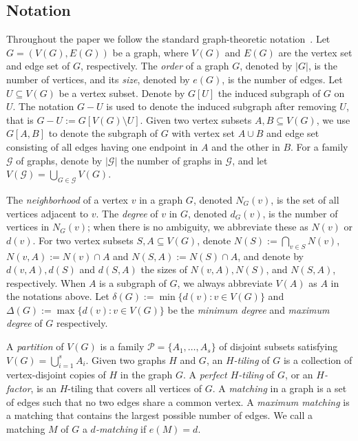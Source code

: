 \documentclass[11pt, a4paper]{article}
\theoremstyle{definition}
\newcommand{\<}{\subseteq}
\begin{document}
\subsection{Notation}
Throughout the paper we follow the standard graph-theoretic notation~\cite{diestel2017graph}. Let $G=(V(G),E(G))$ be a  graph, where $V(G)$ and $E(G)$ are the vertex set and edge set of $G$, respectively.
The \textit{order} of a graph $G$, denoted by $|G|$, is the  number of vertices, and its \textit{size}, denoted by $e(G)$, is the  number of edges.   %
Let $U\subseteq V(G)$ be a vertex subset. Denote by $G[U]$ the induced 
subgraph of $G$ on $U$. The notation $G-U$ is used to denote the induced subgraph after removing $U$,
that is $G-U:=G[V(G)\setminus U]$. Given two vertex subsets $A,B\subseteq V(G)$, we use $G[A,B]$ to denote the subgraph of $G$ with vertex set $A\cup B$ and edge set consisting of all edges having one endpoint in $A$ and the other in $B$. For a family $\mathcal{G}$ of graphs, denote by $|\mathcal{G}|$ the number of graphs in $\mathcal{G}$, and let $V(\mathcal{G}) = \bigcup_{G \in \mathcal{G}} V(G)$.

The \textit{neighborhood} of a vertex $v$ in a graph $G$, denoted $N_G(v)$, is the set of all vertices adjacent to $v$. The \textit{degree} of $v$ in $G$, denoted $d_G(v)$, is the number of vertices in $N_G(v)$; when there is no ambiguity, we abbreviate these as $N(v)$ or $d(v)$.  For two vertex subsets $S, A \subseteq V(G)$, denote  $N(S):=\bigcap_{v\in S}N(v)$, $N(v, A):=N(v)\cap A$ and $N(S, A):=N(S)\cap A$, %
 and denote by $d(v,A), d(S)$ and $d(S,A)$ the sizes of $N(v,A),N(S)$, and $N(S,A)$, respectively. When $A$ is a subgraph of $G$, we always abbreviate $V(A)$ as $A$ in the notations above.  Let $\delta(G):=\min\{d(v):v\in V(G)\}$ and $\Delta(G):=\max \{d(v):v\in V(G)\}$ be the \textit{minimum degree} and \textit{maximum degree} of $G$ respectively.   

A \textit{partition} of $V(G)$ is a family $\mathcal{P}=\{A_1,\ldots,A_s\}$ of disjoint subsets satisfying $V(G)=\bigcup_{i=1}^s A_i$. Given two graphs $H$ and $G$, an  \textit{$H$-tiling} of $G$ is a collection of vertex-disjoint copies of $H$ in the graph $G$. A \textit{perfect $H$-tiling} of $G$, or an \textit{$H$-factor}, is an $H$-tiling that covers all vertices of $G$. %
A \textit{matching} in a graph is a set of edges such that no two edges share a common vertex. A \textit{maximum matching} is a matching that contains the largest possible number of edges. We call a matching $M$ of $G$ a \textit{$d$-matching} if $e(M)=d$.
\end{document}
